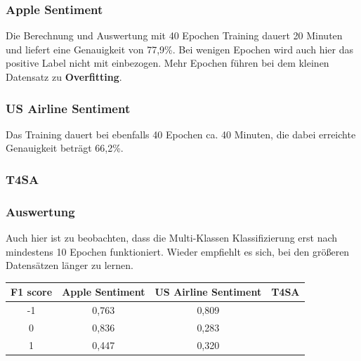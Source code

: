 \subsubsection*{Apple Sentiment}
Die Berechnung und Auswertung mit 40 Epochen Training dauert 20 Minuten und liefert eine Genauigkeit von 77,9\%. Bei wenigen Epochen wird auch hier das positive Label nicht mit einbezogen. Mehr Epochen f\"uhren bei dem kleinen Datensatz zu \textbf{Overfitting}.

\subsubsection*{US Airline Sentiment}
Das Training dauert bei ebenfalls 40 Epochen ca. 40 Minuten, die dabei erreichte Genauigkeit betr\"agt 66,2\%.

\subsubsection*{T4SA}

\subsubsection*{Auswertung}
Auch hier ist zu beobachten, dass die Multi-Klassen Klassifizierung erst nach mindestens 10 Epochen funktioniert. Wieder empfiehlt es sich, bei den gr\"o{\ss}eren Datens\"atzen l\"anger zu lernen.
\begin{center}
\begin{tabular}{|c||c|c|c|}
\hline
F1 score & Apple Sentiment & US Airline Sentiment & T4SA\\ 
\hline\hline
-1 & 0,763 & 0,809 & \\
\hline
0 & 0,836 & 0,283 & \\ 
\hline
1 & 0,447 & 0,320 & \\
\hline    
\end{tabular}
\end{center}

